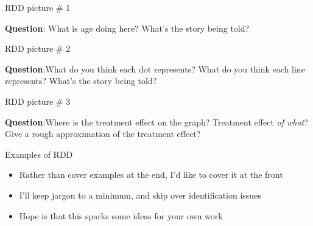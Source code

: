 \documentclass{beamer}
\begin{document}
\begin{frame}{RDD picture \# 1}
	
	\begin{figure}
	\end{figure}

\textbf{Question}: What is age doing here? What's the story being told?

\end{frame}

	
	
\begin{frame}{RDD picture \# 2}
	
	\begin{figure}
	\end{figure}

\textbf{Question}:What do you think each dot represents? What do you think each line represents? What's the story being told?
	
	
\end{frame}

\begin{frame}{RDD picture \# 3}
	
	\begin{figure}
	\end{figure}

\textbf{Question}:Where is the treatment effect on the graph? Treatment effect \emph{of what}? Give a rough approximation of the treatment effect?
	
	
\end{frame}






\begin{frame}{Examples of RDD}

\begin{itemize}
\item Rather than cover examples at the end, I'd like to cover it at the front
\item I'll keep jargon to a minimum, and skip over identification issues
\item Hope is that this sparks some ideas for your own work
\end{itemize}

\end{frame}
\end{document}
